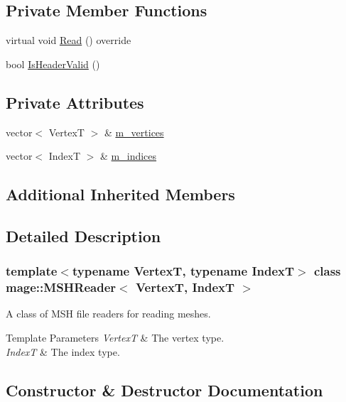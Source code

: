 \subsection*{Private Member Functions}
\begin{DoxyCompactItemize}
\item 
virtual void \hyperlink{classmage_1_1_m_s_h_reader_a26b60060bf61183fb5758a4725c6a205}{Read} () override
\item 
bool \hyperlink{classmage_1_1_m_s_h_reader_a2bc2f2a6410de600c39336f4516a5231}{Is\+Header\+Valid} ()
\end{DoxyCompactItemize}
\subsection*{Private Attributes}
\begin{DoxyCompactItemize}
\item 
vector$<$ VertexT $>$ \& \hyperlink{classmage_1_1_m_s_h_reader_a6b4c0fbf02771cb7bc0ebcb685c3c30b}{m\+\_\+vertices}
\item 
vector$<$ IndexT $>$ \& \hyperlink{classmage_1_1_m_s_h_reader_ae96b703b052eb9951872683e17ab11ae}{m\+\_\+indices}
\end{DoxyCompactItemize}
\subsection*{Additional Inherited Members}


\subsection{Detailed Description}
\subsubsection*{template$<$typename VertexT, typename IndexT$>$\newline
class mage\+::\+M\+S\+H\+Reader$<$ Vertex\+T, Index\+T $>$}

A class of M\+SH file readers for reading meshes.


\begin{DoxyTemplParams}{Template Parameters}
{\em VertexT} & The vertex type. \\
\hline
{\em IndexT} & The index type. \\
\hline
\end{DoxyTemplParams}


\subsection{Constructor \& Destructor Documentation}
\hypertarget{classmage_1_1_m_s_h_reader_af1254630a9770015c7b62d88eb5251bb}{}\label{classmage_1_1_m_s_h_reader_af1254630a9770015c7b62d88eb5251bb} 
